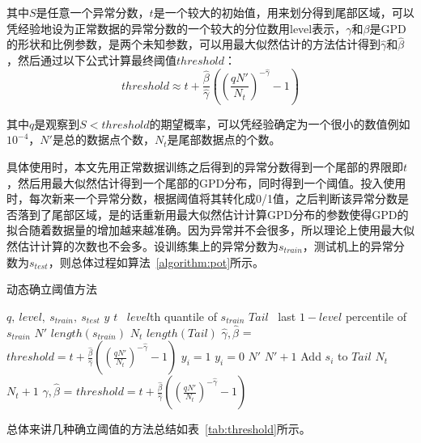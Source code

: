 其中$S$是任意一个异常分数，$t$是一个较大的初始值，用来划分得到尾部区域，可以凭经验地设为正常数据的异常分数的一个较大的分位数用level表示，$\gamma$和$\beta$是GPD的形状和比例参数，是两个未知参数，可以用最大似然估计的方法估计得到$\hat{\gamma}$和$\hat{\beta}$，然后通过以下公式计算最终阈值$threshold$：
\begin{equation*}
  threshold \approx t + \frac{\hat{\beta}}{\hat{\gamma}}((\frac{qN'}{N_{t}})^{-\hat{\gamma}}-1)
\end{equation*}

其中$q$是观察到$S<threshold$的期望概率，可以凭经验确定为一个很小的数值例如$10^{-4}$，$N'$是总的数据点个数，$N_{t}$是尾部数据点的个数。

具体使用时，本文先用正常数据训练之后得到的异常分数得到一个尾部的界限即$t$，然后用最大似然估计得到一个尾部的GPD分布，同时得到一个阈值。投入使用时，每次新来一个异常分数，根据阈值将其转化成0/1值，之后判断该异常分数是否落到了尾部区域，是的话重新用最大似然估计计算GPD分布的参数使得GPD的拟合随着数据量的增加越来越准确。因为异常并不会很多，所以理论上使用最大似然估计计算的次数也不会多。设训练集上的异常分数为$s_{train}$，测试机上的异常分数为$s_{test}$，则总体过程如算法~\ref{algorithm:pot}所示。 

\begin{algorithm}
  \caption{动态确立阈值方法}
  \begin{algorithmic}[1]
      \Require $q,\ level,\ s_{train},\ s_{test}$
      \Ensure $y$
      \State $t$ \gets \ $level$th quantile of $s_{train}$
      \State $Tail$ \gets \ last $1-level$ percentile of $s_{train}$
      \State $N'$ \gets $length(s_{train})$
      \State $N_t$ \gets $length(Tail)$
      \State $\hat{\gamma}, \hat{\beta}$ = 
      \State $threshold = t + \frac{\hat{\beta}}{\hat{\gamma}}((\frac{qN'}{N_{t}})^{-\hat{\gamma}}-1)$
      \State $y_i = 1$
      \Else \State $y_i = 0$
      \EndIf
      \State $N'$ \gets $N' + 1 $
      \State Add $s_i$ to $Tail$
      \State $N_t$ \gets $N_t + 1$
      \State $\hat{\gamma}, \hat{\beta}$ = 
      \State $threshold = t + \frac{\hat{\beta}}{\hat{\gamma}}((\frac{qN'}{N_{t}})^{-\hat{\gamma}}-1)$ 
      \EndIf
      \EndFor
  \end{algorithmic}
  \label{algorithm:pot}
\end{algorithm}

总体来讲几种确立阈值的方法总结如表~\ref{tab:threshold}所示。


